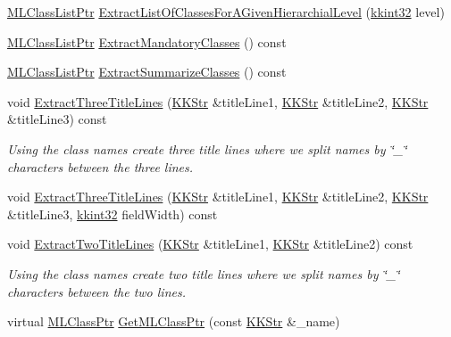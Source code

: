 \begin{DoxyCompactItemize}
\hyperlink{namespace_k_k_m_l_l_af091cde3f4a4315658b41a5e7583fc26}{M\+L\+Class\+List\+Ptr} \hyperlink{class_k_k_m_l_l_1_1_m_l_class_list_a22b580c0a24d6390b4150337209b546b}{Extract\+List\+Of\+Classes\+For\+A\+Given\+Hierarchial\+Level} (\hyperlink{namespace_k_k_b_a8fa4952cc84fda1de4bec1fbdd8d5b1b}{kkint32} level)
\item 
\hyperlink{namespace_k_k_m_l_l_af091cde3f4a4315658b41a5e7583fc26}{M\+L\+Class\+List\+Ptr} \hyperlink{class_k_k_m_l_l_1_1_m_l_class_list_ae0cea1353e79c3ddb8a483e48ce60424}{Extract\+Mandatory\+Classes} () const 
\item 
\hyperlink{namespace_k_k_m_l_l_af091cde3f4a4315658b41a5e7583fc26}{M\+L\+Class\+List\+Ptr} \hyperlink{class_k_k_m_l_l_1_1_m_l_class_list_abeaa30c17ab7d06277ffb986a462f463}{Extract\+Summarize\+Classes} () const 
\item 
void \hyperlink{class_k_k_m_l_l_1_1_m_l_class_list_ab333df46b706048637bb7b98ef552f59}{Extract\+Three\+Title\+Lines} (\hyperlink{class_k_k_b_1_1_k_k_str}{K\+K\+Str} \&title\+Line1, \hyperlink{class_k_k_b_1_1_k_k_str}{K\+K\+Str} \&title\+Line2, \hyperlink{class_k_k_b_1_1_k_k_str}{K\+K\+Str} \&title\+Line3) const 
\begin{DoxyCompactList}\small\item\em Using the class names create three title lines where we split names by \char`\"{}\+\_\+\char`\"{} characters between the three lines. \end{DoxyCompactList}\item 
void \hyperlink{class_k_k_m_l_l_1_1_m_l_class_list_a65e7622af997a504aa973b7b854b9729}{Extract\+Three\+Title\+Lines} (\hyperlink{class_k_k_b_1_1_k_k_str}{K\+K\+Str} \&title\+Line1, \hyperlink{class_k_k_b_1_1_k_k_str}{K\+K\+Str} \&title\+Line2, \hyperlink{class_k_k_b_1_1_k_k_str}{K\+K\+Str} \&title\+Line3, \hyperlink{namespace_k_k_b_a8fa4952cc84fda1de4bec1fbdd8d5b1b}{kkint32} field\+Width) const 
\item 
void \hyperlink{class_k_k_m_l_l_1_1_m_l_class_list_ab36deaa540b8c1651d4424604a748dee}{Extract\+Two\+Title\+Lines} (\hyperlink{class_k_k_b_1_1_k_k_str}{K\+K\+Str} \&title\+Line1, \hyperlink{class_k_k_b_1_1_k_k_str}{K\+K\+Str} \&title\+Line2) const 
\begin{DoxyCompactList}\small\item\em Using the class names create two title lines where we split names by \char`\"{}\+\_\+\char`\"{} characters between the two lines. \end{DoxyCompactList}\item 
virtual \hyperlink{namespace_k_k_m_l_l_ac272393853d59e72e8456f14cd6d8c23}{M\+L\+Class\+Ptr} \hyperlink{class_k_k_m_l_l_1_1_m_l_class_list_ab751a744d6e0d8937ca64b9cdde1488b}{Get\+M\+L\+Class\+Ptr} (const \hyperlink{class_k_k_b_1_1_k_k_str}{K\+K\+Str} \&\+\_\+name)

\end{DoxyCompactItemize}
